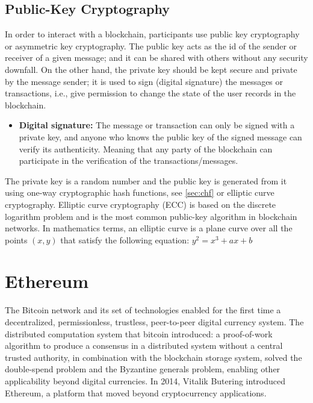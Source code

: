 \documentclass[11pt,a4paper]{report}
\begin{document}
\subsection{Public-Key Cryptography}\label{publickey}
In order to interact with a blockchain, participants use public key cryptography or asymmetric key cryptography\cite{book:pkc}. The public key acts as the id of the sender or receiver of a given message; and it can be shared with others without any security downfall. On the other hand, the private key should be kept secure and private by the message sender; it is used to sign (digital signature) the messages or transactions, i.e., give permission to change the state of the user records in the blockchain.
\begin{itemize}
	\item[] \textbf{Digital signature:} The message or transaction can only be signed with a private key, and anyone who knows the public key of the signed message can verify  its authenticity. Meaning that any party of the blockchain can participate in the verification of the transactions/messages.
\end{itemize}
The private key is a random number and the public key is generated from it using one-way cryptographic hash functions, see \ref{sec:chf} or elliptic curve cryptography\cite{book:pkc}\cite{wiki:ecc}. Elliptic curve cryptography (ECC) is based on the discrete logarithm problem and is the most common public-key algorithm in blockchain networks.
In mathematics terms, an elliptic curve is a plane curve over all the points $(x, y)$ that satisfy the following equation:  $ y^2 = x^3 +ax + b $


\section{Ethereum}\label{sec:eth}
The Bitcoin\cite{bitcoin}\cite{book:masteringBTC} network and its set of technologies enabled for the first time a decentralized, permissionless, trustless, peer-to-peer digital currency system. The distributed computation system that bitcoin introduced: a proof-of-work algorithm to produce a consensus in a distributed system without a central trusted authority, in combination with the blockchain storage system, solved the double-spend problem and the Byzantine generals problem, enabling other applicability beyond digital currencies.  In 2014, Vitalik Butering introduced Ethereum\cite{article:eth}, a platform that moved beyond cryptocurrency applications.
\end{document}
